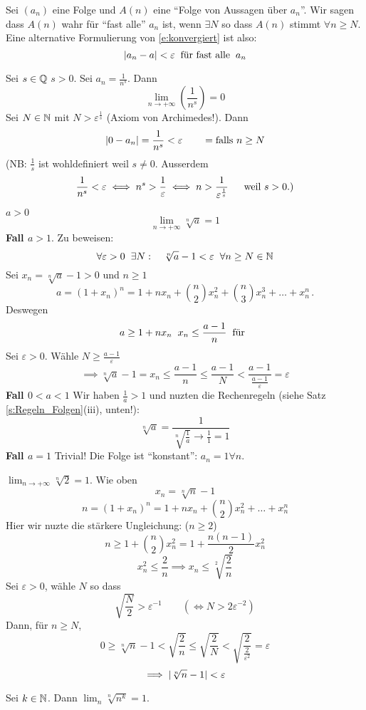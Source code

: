 \begin{Def}
  Sei $(a_n)$ eine Folge und $A(n)$ eine ``Folge von Aussagen über $a_n$''. 
Wir sagen dass $A(n)$ wahr für ``fast alle'' $a_n$ ist, wenn $\exists N$ so dass $A(n)$ 
stimmt $\forall n\geq N$. Eine alternative Formulierung von \eqref{e:konvergiert} ist also:
  \[\mathopen| a_n-a \mathclose|<\varepsilon\hspace{2mm}\text{f\"ur fast alle}\hspace{2mm} a_n\]
\end{Def}
\begin{Bsp}
  Sei $s\in\mathbb{Q}$ $s>0$. Sei $a_n=\frac{1}{n^s}$. Dann
  \[\lim_{n\to+\infty}\left( \frac{1}{n^s} \right)=0\]
  Sei $N\in \mathbb{N}$ mit $N>\varepsilon^{\frac{1}{s}}$ (Axiom von Archimedes!). Dann
  \[\mathopen| 0-a_n \mathclose|=\frac{1}{n^s}<\varepsilon\qquad =\mbox{falls $n\geq N$}\]
(NB: $\frac{1}{s}$ ist wohldefiniert weil $s\neq 0$. Ausserdem
\[\frac{1}{n^s}<\varepsilon \iff n^s>\frac{1}{\varepsilon}\iff n>
\frac{1}{\varepsilon^{\frac{1}{s}}}\quad\hspace{2mm}\text{weil $s> 0$.)}\]
\end{Bsp}
\begin{Bsp}
  $a>0$
  \[\lim_{n\to+\infty}\sqrt[n]{a}=1\]
  {\bf Fall $a>1$}. Zu beweisen:
  \[\forall \varepsilon>0 \hspace{2mm}\exists N:\quad \sqrt[n]{a}-1<\varepsilon\hspace{2mm}\forall n\geq N\in\mathbb{N}\]
  Sei $x_n=\sqrt[n]{a}-1>0$ und $n\geq 1$
  \[a=(1+x_n)^n=1+nx_n+\binom{n}{2}x^2_n+\binom{n}{3}x_n^3+\dots+x_n^n\, .\]
  Deswegen\[a\geq 1+nx_n\hspace{2mm} x_n\leq\frac{a-1}{n}\hspace{2mm}\text{für}\hspace{2mm}\]
  Sei $\varepsilon>0$. Wähle $N\geq \frac{a-1}{\varepsilon}$
  \[\implies\sqrt[n]{a}-1=x_n\leq\frac{a-1}{n}\leq\frac{a-1}{N}<\frac{a-1}{\frac{a-1}{\varepsilon}}=
  \varepsilon\]
  {\bf Fall $0<a<1$} Wir haben $\frac{1}{a}>1$ und nuzten die Rechenregeln (siehe Satz 
\ref{s:Regeln_Folgen}(iii), unten!):
\[\sqrt[n]{a}=\frac{1}{\sqrt[n]{\frac{1}{a}} \to \frac{1}{1} = 1}\]
 {\bf Fall $a=1$} Trivial! Die Folge ist ``konstant'': $a_n=1 \forall n$.
\end{Bsp}
\begin{Bsp}
  $\lim_{n\to+\infty}\sqrt[n]{2} =1$. Wie oben
  \[x_n=\sqrt[n]{n}-1\]
  \[n=(1+x_n)^n=1+nx_n+\binom{n}{2}x_n^2+\dots+x_n^n\]
Hier wir nuzte die st\"arkere Ungleichung: ($n\geq 2$)
\[n\geq1+\binom{n}{2} x_n^2=1+\frac{n(n-1)}{2}x_n^2 \]
\[x_n^2\leq\frac{2}{n}\implies x_n\leq \sqrt[2]{\frac{2}{n}}\]
Sei $\varepsilon>0$, wähle $N$ so dass
  \[\sqrt{\frac{N}{2}}>\varepsilon^{-1}\qquad (\iff N> 2\varepsilon^{-2})\]
Dann, f\"ur $n\geq N$,
  \[0\geq\sqrt[n]{n}-1<\sqrt{\frac{2}{n}}\leq\sqrt{\frac{2}{N}}<\sqrt{\frac{2}{\frac{2}{\varepsilon^2}}}=\varepsilon\]
  \[\implies \mathopen| \sqrt[n]{n}-1 \mathclose|<\varepsilon\]
\end{Bsp}
\begin{Ueb} Sei $k\in \mathbb{N}$. Dann $\lim_n \sqrt[n]{n^k} =1$.
\end{Ueb}

